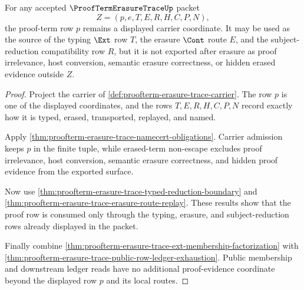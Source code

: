 \begin{theorem}
\label{thm:proofterm-erasure-trace-proof-row-obligation}
For any accepted $\ProofTermErasureTraceUp$ packet
$$
Z=(p,e,T,E,R,H,C,P,N),
$$
the proof-term row $p$ remains a displayed carrier coordinate. It may be used
as the source of the typing $\Ext$ row $T$, the erasure $\Cont$ route $E$, and
the subject-reduction compatibility row $R$, but it is not exported after
erasure as proof irrelevance, host conversion, semantic erasure correctness,
or hidden erased evidence outside $Z$.
\end{theorem}
\begin{proof}
Project the carrier of
\autoref{def:proofterm-erasure-trace-carrier}. The row $p$ is one of the
displayed coordinates, and the rows $T,E,R,H,C,P,N$ record exactly how it is
typed, erased, transported, replayed, and named.

Apply \autoref{thm:proofterm-erasure-trace-namecert-obligations}. Carrier
admission keeps $p$ in the finite tuple, while erased-term non-escape excludes
proof irrelevance, host conversion, semantic erasure correctness, and hidden
proof evidence from the exported surface.

Now use \autoref{thm:proofterm-erasure-trace-typed-reduction-boundary} and
\autoref{thm:proofterm-erasure-trace-erasure-route-replay}. These results show
that the proof row is consumed only through the typing, erasure, and
subject-reduction rows already displayed in the packet.

Finally combine
\autoref{thm:proofterm-erasure-trace-ext-membership-factorization} with
\autoref{thm:proofterm-erasure-trace-public-row-ledger-exhaustion}. Public
membership and downstream ledger reads have no additional proof-evidence
coordinate beyond the displayed row $p$ and its local routes.
\end{proof}

